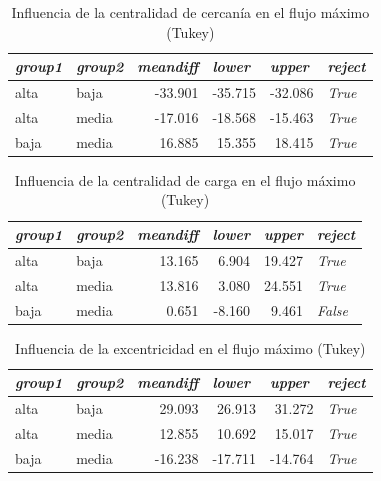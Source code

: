 \documentclass{article}
\begin{document}
\begin{table}[htbp]
  \centering
  \caption{Influencia de la centralidad de cercanía en el flujo máximo (Tukey)}
    \begin{tabular}{llrrrl}
    \toprule
    \textit{\textbf{group1}} & \textit{\textbf{group2}} & \multicolumn{1}{l}{\textit{\textbf{meandiff}}} & \multicolumn{1}{l}{\textit{\textbf{lower}}} & \multicolumn{1}{l}{\textit{\textbf{upper}}} & \textit{\textbf{reject}} \\
    \midrule
    alta  & baja  & -33.901 & -35.715 & -32.086 & \textit{True} \\
    alta  & media & -17.016 & -18.568 & -15.463 & \textit{True} \\
    baja  & media & 16.885 & 15.355 & 18.415 & \textit{True} \\
    \bottomrule
    \end{tabular}%
  \label{tab:t29}%
\end{table}%

\begin{table}[htbp]
  \centering
  \caption{Influencia de la centralidad de carga en el flujo máximo (Tukey)}
    \begin{tabular}{llrrrl}
    \toprule
    \textit{\textbf{group1}} & \textit{\textbf{group2}} & \multicolumn{1}{l}{\textit{\textbf{meandiff}}} & \multicolumn{1}{l}{\textit{\textbf{lower}}} & \multicolumn{1}{l}{\textit{\textbf{upper}}} & \textit{\textbf{reject}} \\
    \midrule
    alta  & baja  & 13.165 & 6.904 & 19.427 & \textit{True} \\
    alta  & media & 13.816 & 3.080 & 24.551 & \textit{True} \\
    baja  & media & 0.651 & -8.160 & 9.461 & \textit{False} \\
    \bottomrule
    \end{tabular}%
  \label{tab:t30}%
\end{table}%

\begin{table}[htbp]
  \centering
  \caption{Influencia de la excentricidad en el flujo máximo (Tukey)}
    \begin{tabular}{llrrrl}
    \toprule
    \textit{\textbf{group1}} & \textit{\textbf{group2}} & \multicolumn{1}{l}{\textit{\textbf{meandiff}}} & \multicolumn{1}{l}{\textit{\textbf{lower}}} & \multicolumn{1}{l}{\textit{\textbf{upper}}} & \textit{\textbf{reject}} \\
    \midrule
    alta  & baja  & 29.093 & 26.913 & 31.272 & \textit{True} \\
    alta  & media & 12.855 & 10.692 & 15.017 & \textit{True} \\
    baja  & media & -16.238 & -17.711 & -14.764 & \textit{True} \\
    \bottomrule
    \end{tabular}%
  \label{tab:t31}%
\end{table}%
\end{document}
